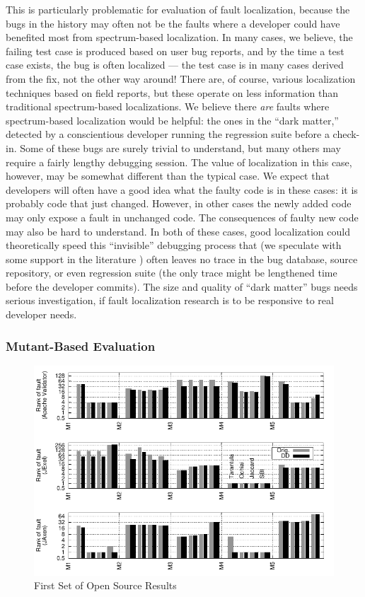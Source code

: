 This is particularly problematic for evaluation of fault localization,
because the bugs in the history may often not be the faults where a
developer could have benefited most from spectrum-based localization.
In many cases, we believe, the failing test case is produced based on
user bug reports, and by the time a test case exists, the bug is often
localized --- the test case is in many cases derived from the fix, not
the other way around!  There are, of course, various localization
techniques based on field reports, but these operate on less
information than traditional spectrum-based localizations.  We believe
there \emph{are} faults where spectrum-based localization would be
helpful: the ones in the ``dark matter,'' detected by a conscientious
developer running the regression suite before a check-in.  Some of
these bugs are surely trivial to understand, but many others may
require a fairly lengthy debugging session.  The value of localization
in this case, however, may be somewhat different than the typical
case.  We expect that developers will often have a good idea what the
faulty code is in these cases: it is probably code that just changed.
However, in other cases the newly added code may only expose a fault
in unchanged code.  The consequences of faulty new code may also be
hard to understand.  In both of these cases, good localization could
theoretically speed this ``invisible'' debugging process that (we
speculate with some support in the literature \cite{Dangerous}) often
leaves no trace in the bug database, source repository, or even
regression suite (the only trace might be lengthened time before the
developer commits).  The size and quality of ``dark matter'' bugs
needs serious investigation, if fault localization research is to be
responsive to real developer needs.

\subsubsection{Mutant-Based Evaluation}

\begin{figure}[t]
  \centering
  \includegraphics[width=\columnwidth]{opensource1}
  \caption{First Set of Open Source Results}
  \label{fig:opensource1}
\end{figure}

